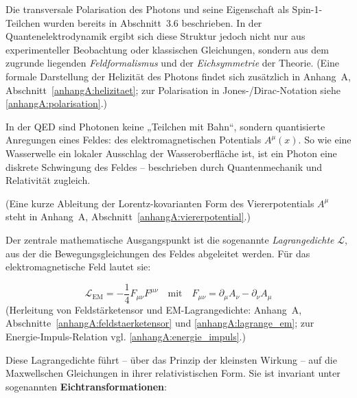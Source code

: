 Die transversale Polarisation des Photons und seine Eigenschaft als Spin\mbox{-}1\mbox{-}Teilchen wurden bereits in Abschnitt~3.6 beschrieben.
In der Quantenelektrodynamik ergibt sich diese Struktur jedoch nicht nur aus experimenteller Beobachtung oder klassischen Gleichungen, sondern aus dem zugrunde liegenden \emph{Feldformalismus} und der \emph{Eichsymmetrie} der Theorie.
(Eine formale Darstellung der Helizität des Photons findet sich zusätzlich in Anhang~A, Abschnitt~\ref{anhangA:helizitaet}; zur Polarisation in Jones-/Dirac-Notation siehe \ref{anhangA:polarisation}.)

\vspace{1em}
\begin{tcolorbox}[physikbox, title=Was ist der Feldformalismus?]
	\label{box:was ist Feldformalismus}
	\small
	In der QED sind Photonen keine „Teilchen mit Bahn“, sondern quantisierte Anregungen eines Feldes: des elektromagnetischen Potentials \( A^\mu(x) \). So wie eine Wasserwelle ein lokaler Ausschlag der Wasseroberfläche ist, ist ein Photon eine diskrete Schwingung des Feldes – beschrieben durch Quantenmechanik und Relativität zugleich.
\end{tcolorbox}
\vspace{1em}
(Eine kurze Ableitung der Lorentz-kovarianten Form des Viererpotentials \(A^\mu\) steht in Anhang~A, Abschnitt~\ref{anhangA:viererpotential}.)

Der zentrale mathematische Ausgangspunkt ist die sogenannte \emph{Lagrangedichte} \( \mathcal{L} \), aus der die Bewegungsgleichungen des Feldes abgeleitet werden.
Für das elektromagnetische Feld lautet sie:

\[
\mathcal{L}_{\text{EM}} = -\frac{1}{4} F_{\mu\nu} F^{\mu\nu}
\quad \text{mit} \quad F_{\mu\nu} = \partial_\mu A_\nu - \partial_\nu A_\mu
\]
(Herleitung von Feldstärketensor und EM-Lagrangedichte: Anhang~A, Abschnitte~\ref{anhangA:feldstaerketensor} und \ref{anhangA:lagrange_em}; zur Energie-Impuls-Relation vgl. \ref{anhangA:energie_impuls}.)

Diese Lagrangedichte führt – über das Prinzip der kleinsten Wirkung – auf die Maxwellschen Gleichungen in ihrer relativistischen Form.
Sie ist invariant unter sogenannten \textbf{Eichtransformationen}:

